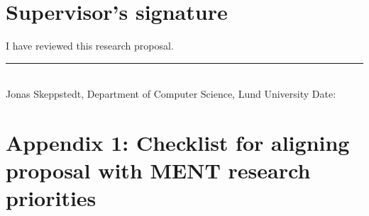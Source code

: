 \documentclass[12pt,a4paper]{article}
\begin{document}
\newpage
\section*{Supervisor's signature}
I have reviewed this research proposal.

\vspace{2cm}
\rule{4.5cm}{0.4pt}\\
Jonas Skeppstedt, Department of Computer Science, Lund University \hfill Date:

\newpage
\section*{Appendix 1: Checklist for aligning proposal with MENT research priorities}
\end{document}
